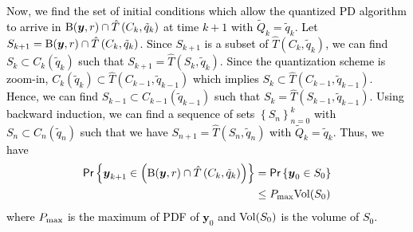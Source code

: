 \documentclass[10pt,twocolumn,twoside]{IEEEtran}
\begin{document}
\begin{IEEEproof}
\textcolor{black}{Now, we find the set of initial conditions which allow the quantized PD algorithm to arrive in ${\rm B}{\left({{\ensuremath{\boldsymbol{{y}}}},r}\right)}\cap {\ensuremath{\hat{T}\left({C_k},{\tilde{q}_k}\right)}}$ at time $k+1$ with $\tilde{Q}_k=\tilde{q}_k$. Let $S_{k+1}={\rm B}{\left({{\ensuremath{\boldsymbol{{y}}}},r}\right)}\cap {\ensuremath{\hat{T}\left({C_k},{\tilde{q}_k}\right)}}$. Since $S_{k+1}$ is a subset of ${\ensuremath{\hat{T}\left({C_k},{\tilde{q}_k}\right)}}$, we can find $S_k\subset C_k{\left({\tilde{q}_k}\right)}$ such that $S_{k+1}={\ensuremath{\hat{T}\left({S_k},{\tilde{q}_k}\right)}}$. Since the quantization scheme is zoom-in, $ C_k{\left({\tilde{q}_k}\right)}\subset {\ensuremath{\hat{T}\left({C_{k-1}},{\tilde{q}_{k-1}}\right)}}$ which implies $S_k\subset{\ensuremath{\hat{T}\left({C_{k-1}},{\tilde{q}_{k-1}}\right)}}$. Hence, we can find $S_{k-1}\subset C_{k-1}{\left({\tilde{q}_{k-1}}\right)}$ such that $S_k={\ensuremath{\hat{T}\left({S_{k-1}},{\tilde{q}_{k-1}}\right)}}$. Using  backward induction, we can find a sequence of sets $\left\{S_n\right\}_{n=0}^k$ with $S_n\subset C_n{\left({\tilde{q}_n}\right)}$ such that we have $S_{n+1}={\ensuremath{\hat{T}\left({S_n},{\tilde{q}_n}\right)}}$ with $\tilde{Q}_k=\tilde{q}_k$. 
Thus, we have 
\begin{align}\label{Eq: Prob-UpB}
{\ensuremath{\mathsf{Pr}\left\{{{\ensuremath{\boldsymbol{{y}}}}_{k+1}\in{\left({{\rm B}{\left({{\ensuremath{\boldsymbol{{y}}}},r}\right)}\cap {\ensuremath{\hat{T}\left({C_k},{\tilde{q}_k}\right)}}}\right)}}\right\}}}&={\ensuremath{\mathsf{Pr}\left\{{{\ensuremath{\boldsymbol{{y}}}}_{0}\in S_0}\right\}}}\nonumber\\
&\leq P_{\rm max} {\rm Vol}{\left({S_0}\right)} 
\end{align}
where $P_{\rm max}$ is the maximum of PDF of ${\ensuremath{\boldsymbol{{y}}}}_0$ and ${\rm Vol}{\left({S_0}\right)}$ is the volume of $S_0$.}


\end{IEEEproof}
\end{document}
